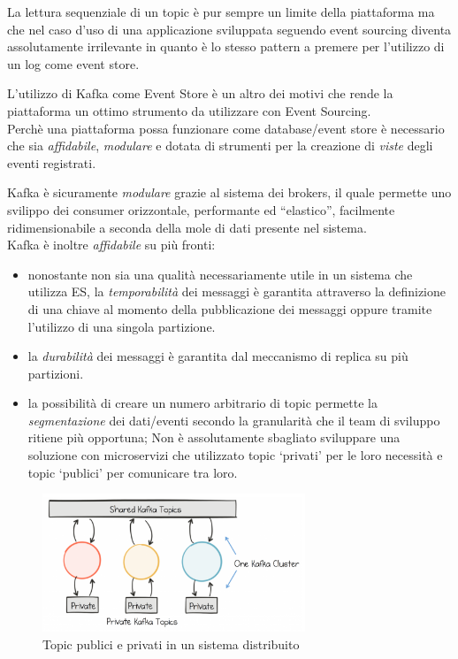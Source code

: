 \documentclass[]{article}
\providecommand{\tightlist}{%
  \setlength{\itemsep}{0pt}\setlength{\parskip}{0pt}}
\begin{document}
La lettura sequenziale di un topic è pur sempre un limite della
piattaforma ma che nel caso d'uso di una applicazione sviluppata
seguendo event sourcing diventa assolutamente irrilevante in quanto è lo
stesso pattern a premere per l'utilizzo di un log come event store.

L'utilizzo di Kafka come Event Store è un altro dei motivi che rende la
piattaforma un ottimo strumento da utilizzare con Event Sourcing.\\
Perchè una piattaforma possa funzionare come database/event store è
necessario che sia \emph{affidabile}, \emph{modulare} e dotata di
strumenti per la creazione di \emph{viste} degli eventi registrati.

Kafka è sicuramente \emph{modulare} grazie al sistema dei brokers, il
quale permette uno svilippo dei consumer orizzontale, performante ed
``elastico'', facilmente ridimensionabile a seconda della mole di dati
presente nel sistema.\\
Kafka è inoltre \emph{affidabile} su più fronti:

\begin{itemize}
\tightlist
\item
  nonostante non sia una qualità necessariamente utile in un sistema che
  utilizza ES, la \emph{temporabilità} dei messaggi è garantita
  attraverso la definizione di una chiave al momento della pubblicazione
  dei messaggi oppure tramite l'utilizzo di una singola partizione.
\item
  la \emph{durabilità} dei messaggi è garantita dal meccanismo di
  replica su più partizioni.
\item
  la possibilità di creare un numero arbitrario di topic permette la
  \emph{segmentazione} dei dati/eventi secondo la granularità che il
  team di sviluppo ritiene più opportuna; Non è assolutamente sbagliato
  sviluppare una soluzione con microservizi che utilizzato topic
  `privati' per le loro necessità e topic `publici' per comunicare tra
  loro.
\end{itemize}

\begin{figure}
\centering
\includegraphics[width=0.70000\textwidth]{../images/public-private-topics.png}
\caption{Topic publici e privati in un sistema distribuito
\label{figure_5}}
\end{figure}
\end{document}
